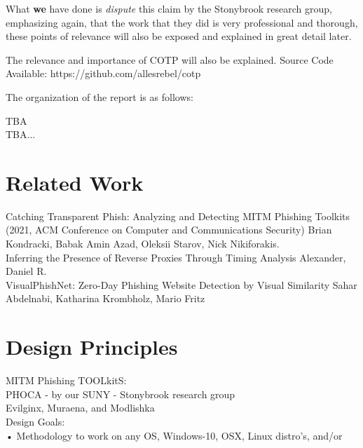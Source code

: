 \documentclass[a4paper, 11pt]{article} 				%
\begin{document}
What \textbf{we} have done is \textit{dispute} this claim by the Stonybrook research group, emphasizing again, that the work that they did is very professional and thorough, these points of relevance will also be exposed and explained in great detail later. 

\noindent
The relevance and importance of COTP will also be explained.
Source Code Available: https://github.com/allesrebel/cotp

The organization of the report is as follows:

\noindent
TBA\\
TBA...



\section{Related Work}
Catching Transparent Phish: Analyzing and Detecting MITM Phishing Toolkits (2021, ACM Conference on Computer and Communications Security)
Brian Kondracki, Babak Amin Azad, Oleksii Starov, Nick Nikiforakis.\\

\noindent
Inferring the Presence of Reverse Proxies Through Timing Analysis
Alexander, Daniel R.\\

\noindent
VisualPhishNet: Zero-Day Phishing Website Detection by Visual Similarity
Sahar Abdelnabi, Katharina Krombholz, Mario Fritz\\



\section{Design Principles}
MITM Phishing TOOLkitS:\\
PHOCA - by our SUNY - Stonybrook research group\\
Evilginx, Muraena, and Modlishka \\


\noindent	%
Design Goals:\\
• Methodology to work on any OS, Windows-10, OSX, Linux distro's,  and/or 
\end{document}
